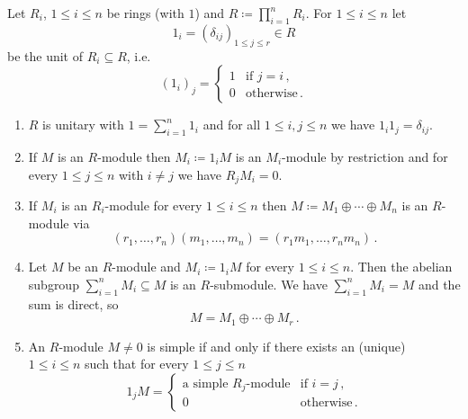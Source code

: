\begin{lem}\label{lem: modules over direct sum of algebras}
  Let $R_i$, $1 \leq i \leq n$ be rings (with $1$) and $R \coloneqq \prod_{i=1}^n R_i$.
  For $1 \leq i \leq n$ let
  \[
      1_i
    = (\delta_{ij})_{1 \leq j \leq r}
    \in R
  \]
  be the unit of $R_i \subseteq R$, i.e.\
  \[
      (1_i)_j
    = \begin{cases}
        1 & \text{if } j = i \,,  \\
        0 & \text{otherwise} \,.
      \end{cases}
  \]
  \begin{enumerate}[label=\emph{\alph*)},leftmargin=*]
    \item
      $R$ is unitary with $1 = \sum_{i=1}^n 1_i$ and for all $1 \leq i,j \leq n$ we have $1_i 1_j = \delta_{ij}$.
    \item
      If $M$ is an $R$-module then $M_i \coloneqq 1_i M$ is an $M_i$-module by restriction and for every $1 \leq j \leq n$ with $i \neq j$ we have $R_j M_i = 0$.
    \item
      If $M_i$ is an $R_i$-module for every $1 \leq i \leq n$ then $M \coloneqq M_1 \oplus \dotsb \oplus M_n$ is an $R$-module via
      \[
          (r_1, \dotsc, r_n) (m_1, \dotsc, m_n)
        = (r_1 m_1, \dotsc, r_n m_n) \,.
      \]
    \item
      Let $M$ be an $R$-module and $M_i \coloneqq 1_i M$ for every $1 \leq i \leq n$.
      Then the abelian subgroup \mbox{$\sum_{i=1}^n M_i \subseteq M$} is an $R$-submodule.
      We have $\sum_{i=1}^n M_i = M$ and the sum is direct, so
      \[
        M = M_1 \oplus \dotsb \oplus M_r \,.
      \]
    \item
      An $R$-module $M \neq 0$ is simple if and only if there exists an (unique) \mbox{$1 \leq i \leq n$} such that for every $1 \leq j \leq n$
      \[
        1_j M
        = \begin{cases}
            \text{a simple $R_j$-module} & \text{if } i = j \,, \\
                                       0 & \text{otherwise} \,.
          \end{cases}
      \]
  \end{enumerate}
\end{lem}
